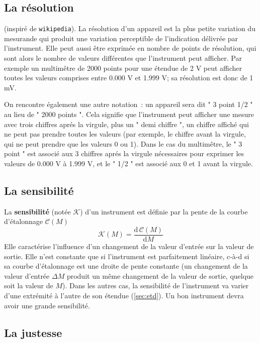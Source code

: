 \subsection{La résolution}

(inspiré de \texttt{wikipedia}). La résolution d'un appareil est la plus petite variation du mesurande qui produit une variation perceptible de l'indication délivrée par l'instrument. Elle peut aussi être exprimée en nombre de points de résolution, qui sont alors le nombre de valeurs différentes que l'instrument peut afficher. Par exemple un multimêtre de 2000 points pour une étendue de 2 V peut afficher toutes les valeurs comprises entre 0.000 V et 1.999 V; sa résolution est donc de 1 mV.

On rencontre également une autre notation~: un appareil sera dit " 3 point 1/2 " au lieu de " 2000 points ". Cela signifie que l'instrument peut afficher une mesure avec trois chiffres aprés la virgule, plus un " demi chiffre ", un chiffre affiché qui ne peut pas prendre toutes les valeurs (par exemple, le chiffre avant la virgule, qui ne peut prendre que les valeurs 0 ou 1). Dans le cas du multimêtre, le " 3 point " est associé aux 3 chiffres aprés la virgule nécessaires pour exprimer les valeurs de 0.000 V à 1.999 V, et le " 1/2 " est associé aux 0 et 1 avant la virgule.

\subsection{La sensibilité}

La \textbf{sensibilité} (notée $\mathcal{K}$) d'un instrument est définie par la pente de la courbe d'étalonnage $\mathcal{C}(M)$
$$
\mathcal{K}(M)=\frac{\text{d}\,\mathcal{C}(M)}{\text{d}M}
$$
Elle caractérise l'influence d'un changement de la valeur d'entrée sur la valeur de sortie. Elle n'est constante que si l'instrument est parfaitement linéaire, c-à-d si sa courbe d'étalonnage est une droite de pente constante (un changement de la valeur d'entrée $\Delta M$ produit un même changement de la valeur de sortie, quelque soit la valeur de $M$). Dans les autres cas, la sensibilité de l'instrument va varier d'une extrémité à l'autre de son étendue (\ref{sec:etd}). Un bon instrument devra avoir une grande sensibilité.

\subsection{La justesse}

